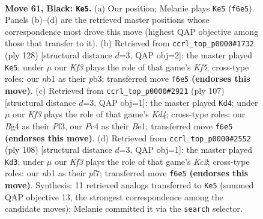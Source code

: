 \documentclass[11pt]{article}
\begin{document}
\clearpage

\begin{figure}[p]\centering
\begin{subfigure}{0.46\textwidth}\centering
\resizebox{\linewidth}{!}{%
\newchessgame
\chessboard[
  setfen={5B2/8/p4k2/8/2p3b1/8/5K2/1N6 b - - 21 61},
  showmover=false,
  pgfstyle=straightmove, color=movearrow, markmove={f6-e5}
]}
\caption{}
\end{subfigure}\hfill
\begin{subfigure}{0.46\textwidth}\centering
\resizebox{\linewidth}{!}{%
\newchessgame
\chessboard[
  setfen={5B2/3k4/8/5K1b/8/1p2P3/1P6/8 w - - 5 65},
  showmover=false,
  pgfstyle=straightmove, color=movearrow, markmove={f5-e5}
]}
\caption{}
\end{subfigure}
\\[4pt]
\begin{subfigure}{0.46\textwidth}\centering
\resizebox{\linewidth}{!}{%
\newchessgame
\chessboard[
  setfen={8/8/8/3k3p/8/3B1p2/8/4b2K b - - 1 54},
  showmover=false,
  pgfstyle=straightmove, color=movearrow, markmove={d5-d4}
]}
\caption{}
\end{subfigure}\hfill
\begin{subfigure}{0.46\textwidth}\centering
\resizebox{\linewidth}{!}{%
\newchessgame
\chessboard[
  setfen={8/5p2/5B2/3k4/1b6/8/2K2PP1/8 w - - 7 55},
  showmover=false,
  pgfstyle=straightmove, color=movearrow, markmove={c2-d3}
]}
\caption{}
\end{subfigure}
\caption{\textbf{Move 61, Black: \texttt{Ke5}.} (a) Our position; Melanie plays \texttt{Ke5} (\texttt{f6e5}). Panels (b)--(d) are the retrieved master positions whose correspondence most drove this move (highest QAP objective among those that transfer to it). (b) Retrieved from \texttt{ccrl\_top\_p0000\#1732} (ply 128) [structural distance $d$=3, QAP obj=2]: the master played \texttt{Ke5}; under $\mu$ our \emph{Kf3} plays the role of that game's \emph{Kf5}; cross-type roles: our \emph{n}b1 as their \emph{p}b3; transferred move \texttt{f6e5} \textbf{(endorses this move)}. (c) Retrieved from \texttt{ccrl\_top\_p0000\#2921} (ply 107) [structural distance $d$=3, QAP obj=1]: the master played \texttt{Kd4}; under $\mu$ our \emph{Kf3} plays the role of that game's \emph{Kd4}; cross-type roles: our \emph{B}g4 as their \emph{P}f3, our \emph{P}c4 as their \emph{B}e1; transferred move \texttt{f6e5} \textbf{(endorses this move)}. (d) Retrieved from \texttt{ccrl\_top\_p0000\#2552} (ply 108) [structural distance $d$=3, QAP obj=1]: the master played \texttt{Kd3}; under $\mu$ our \emph{Kf3} plays the role of that game's \emph{Kc2}; cross-type roles: our \emph{n}b1 as their \emph{p}f7; transferred move \texttt{f6e5} \textbf{(endorses this move)}. Synthesis: 11 retrieved analogs transferred to \texttt{Ke5} (summed QAP objective 13, the strongest correspondence among the candidate moves); Melanie committed it via the \texttt{search} selector.}
\label{fig:thought-m121}
\end{figure}
\end{document}
